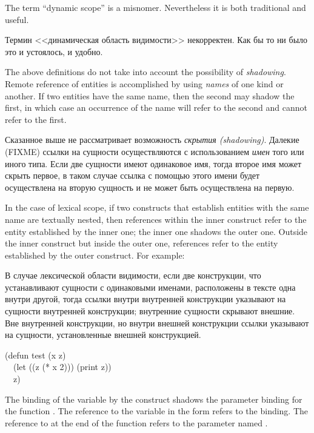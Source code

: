 \begin{newer}
The term ``dynamic scope'' is a misnomer.  Nevertheless
it is both traditional and useful.

Термин <<динамическая область видимости>> некорректен. Как бы то ни было это и
устоялось, и удобно.
\end{newer}

The above definitions do not take into account the possibility of
{\it shadowing}.  Remote reference of entities is accomplished by using
{\it names} of one kind or another.  If two entities have the same name,
then the second may shadow the first, in which case an occurrence
of the name will refer to the second and cannot refer to the first.

Сказанное выше не рассматривает возможность {\it скрытия
  (shadowing)}. Далекие (FIXME) ссылки на сущности осуществляются с
использованием {\it имен} того или иного типа. Если две сущности имеют
одинаковое имя, тогда второе имя может скрыть первое, в таком случае ссылка с
помощью этого имени будет осуществлена на вторую сущность и не может быть
осуществлена на первую.

In the case of lexical scope,
if two constructs that establish entities
with the same name are textually nested, then references within the inner
construct refer to the entity established by the inner one; the inner one
shadows the outer one.  Outside the inner construct but inside the outer one,
references refer to the entity established by the outer construct.
For example:

В случае лексической области видимости,
если две конструкции, что устанавливают сущности с одинаковыми именами,
расположены в тексте одна внутри другой, тогда ссылки внутри внутренней
конструкции указывают на сущности внутренней конструкции; внутренние сущности
скрывают внешние. Вне внутренней конструкции, но внутри внешней конструкции
ссылки указывают на сущности, установленные внешней конструкцией.

\begin{lisp}
(defun test (x z) \\
~~(let ((z (* x 2))) (print z)) \\
~~z)
\end{lisp}

The binding of the variable  by the  construct shadows
the parameter binding for the function .  The reference to the
variable  in the  form refers to the  binding.
The reference to  at the end of the function refers to the parameter
named .

